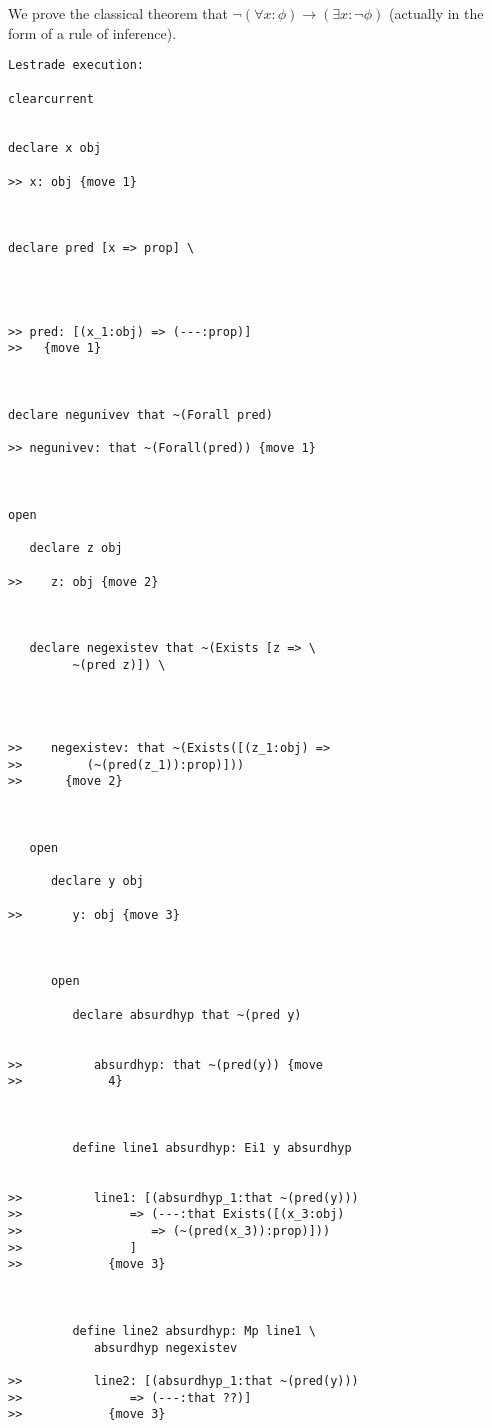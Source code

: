 \documentclass[12pt]{article}
\begin{document}
We prove the classical theorem that $\neg (\forall x:\phi) \rightarrow (\exists x:\neg\phi)$ (actually in the form of a rule of inference).

\begin{verbatim}Lestrade execution:

clearcurrent


declare x obj

>> x: obj {move 1}



declare pred [x => prop] \
   



>> pred: [(x_1:obj) => (---:prop)]
>>   {move 1}



declare negunivev that ~(Forall pred)

>> negunivev: that ~(Forall(pred)) {move 1}



open

   declare z obj

>>    z: obj {move 2}



   declare negexistev that ~(Exists [z => \
         ~(pred z)]) \
      



>>    negexistev: that ~(Exists([(z_1:obj) =>
>>         (~(pred(z_1)):prop)]))
>>      {move 2}



   open

      declare y obj

>>       y: obj {move 3}



      open

         declare absurdhyp that ~(pred y)


>>          absurdhyp: that ~(pred(y)) {move
>>            4}



         define line1 absurdhyp: Ei1 y absurdhyp


>>          line1: [(absurdhyp_1:that ~(pred(y)))
>>               => (---:that Exists([(x_3:obj)
>>                  => (~(pred(x_3)):prop)]))
>>               ]
>>            {move 3}



         define line2 absurdhyp: Mp line1 \
            absurdhyp negexistev

>>          line2: [(absurdhyp_1:that ~(pred(y)))
>>               => (---:that ??)]
>>            {move 3}




\end{verbatim}
\end{document}
